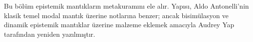 \documentclass[../../../include/open-logic-chapter]{subfiles}
\begin{document}

\begin{editorial}
  Bu bölüm epistemik mantıkların metakuramını ele alır. Yapısı, Aldo
  Antonelli'nin klasik temel modal mantık üzerine notlarına benzer; ancak
  bisimülasyon ve dinamik epistemik mantıklar üzerine malzeme eklemek amacıyla
  Audrey Yap tarafından yeniden yazılmıştır.
\end{editorial}



\OLEndChapterHook
\end{document}
